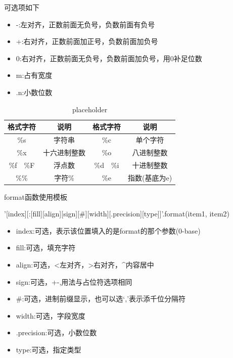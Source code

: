       可选项如下
      \begin{itemize}
        \item -:左对齐，正数前面无负号，负数前面有负号
        \item +:右对齐，正数前面加正号，负数前面加负号
        \item 0:右对齐，正数前面无负号，负数前面加负号，用0补足位数
        \item m:占有宽度
        \item .n:小数位数
      \end{itemize}

      \begin{table}[htb]
        \centering
        \caption{placeholder}
        \label{tab:placeholder}
        \begin{tabular}{cccc}
          \toprule[1.5pt]
          格式字符 & 说明 & 格式字符 & 说明 \\
          \midrule
          \%s & 字符串 & \%c & 单个字符 \\
          \%x & 十六进制整数 & \%o & 八进制整数 \\
          \%f~~\%F & 浮点数 & \%d~~\%i & 十进制整数 \\
          \%\% & 字符\% & \%e & 指数(基底为e) \\
          \bottomrule[1.5pt]
        \end{tabular}
      \end{table}
  
      format函数使用模板
      \begin{codeblock}[language=python, caption={format string}]
        '{[index][:[fill][align][sign][#][width][.precision][type]]}'.format(item1, item2)
      \end{codeblock}

      \begin{itemize}
        \item index:可选，表示该位置填入的是format的那个参数(0-base)
        \item fill:可选，填充字符
        \item align:可选，<左对齐，>右对齐，\^{}内容居中
        \item sign:可选，+-,用法与占位符选项相同
        \item \#:可选，进制前缀显示，也可以选`,'表示添千位分隔符
        \item width:可选，字段宽度
        \item .precision:可选，小数位数
        \item type:可选，指定类型
      \end{itemize}

